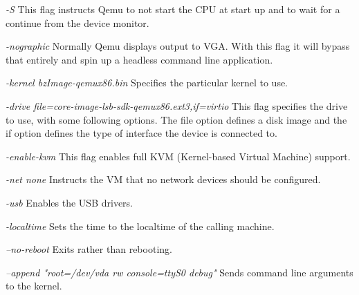 \documentclass[10pt,draftclsnofoot,onecolumn]{IEEEtran}
\begin{document}
\textit{-S}
This flag instructs Qemu to not start the CPU at start up and to wait for a continue from the device monitor.

\textit{-nographic}
Normally Qemu displays output to VGA.
With this flag it will bypass that entirely and spin up a headless command line application.

\textit{-kernel bzImage-qemux86.bin}
Specifies the particular kernel to use.

\textit{-drive file=core-image-lsb-sdk-qemux86.ext3,if=virtio}
This flag specifies the drive to use, with some following options.
The file option defines a disk image and the if option defines the type of interface the device is connected to.

\textit{-enable-kvm}
This flag enables full KVM (Kernel-based Virtual Machine) support.

\textit{-net none}
Instructs the VM that no network devices should be configured.

\textit{-usb}
Enables the USB drivers.

\textit{-localtime}
Sets the time to the localtime of the calling machine.

\textit{--no-reboot}
Exits rather than rebooting.

\textit{--append "root=/dev/vda rw console=ttyS0 debug"}
Sends command line arguments to the kernel.
\end{document}
